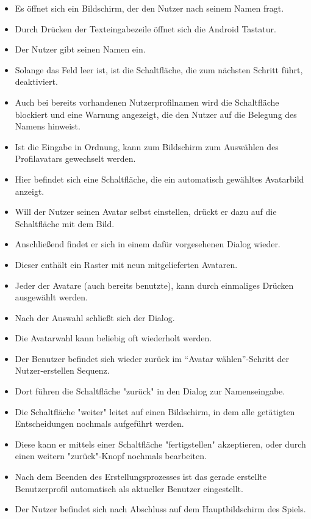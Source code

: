 \begin{itemize}
\item Es öffnet sich ein Bildschirm, der den Nutzer nach seinem Namen fragt.
\item Durch Drücken der Texteingabezeile öffnet sich die Android Tastatur.
\item Der Nutzer gibt seinen Namen ein. 
\item Solange das Feld leer ist, ist die Schaltfläche, die zum nächsten Schritt führt, deaktiviert.
\item  Auch bei bereits vorhandenen Nutzerprofilnamen wird die Schaltfläche blockiert und eine Warnung angezeigt,
die den Nutzer auf die Belegung des Namens hinweist. 
\item Ist die Eingabe in Ordnung, kann zum Bildschirm zum Auswählen des Profilavatars gewechselt werden.
\item Hier befindet sich eine Schaltfläche, die ein automatisch gewähltes Avatarbild anzeigt.
\item Will der Nutzer seinen Avatar selbst einstellen, drückt er dazu auf die Schaltfläche mit dem Bild.
\item Anschließend findet er sich in einem dafür vorgesehenen Dialog wieder.
\item Dieser enthält ein Raster mit neun mitgelieferten Avataren.
\item Jeder der Avatare (auch bereits benutzte), kann durch einmaliges Drücken ausgewählt werden.
\item Nach der Auswahl schließt sich der Dialog.
\item Die Avatarwahl kann beliebig oft wiederholt werden.
\item Der Benutzer befindet sich wieder zurück im ``Avatar wählen''-Schritt der Nutzer-erstellen Sequenz.
\item Dort führen die Schaltfläche "zurück" in den Dialog zur Namenseingabe.
\item Die Schaltfläche "weiter" leitet auf einen Bildschirm, in dem alle getätigten Entscheidungen
nochmals aufgeführt werden. 
\item Diese kann er mittels einer Schaltfläche "fertigstellen" akzeptieren, oder durch einen weitern "zurück"-Knopf 
nochmals bearbeiten.
\item Nach dem Beenden des Erstellungsprozesses ist das gerade erstellte 
Benutzerprofil automatisch als aktueller Benutzer eingestellt.
\item Der Nutzer befindet sich nach Abschluss auf dem Hauptbildschirm des Spiels.
\end{itemize}
